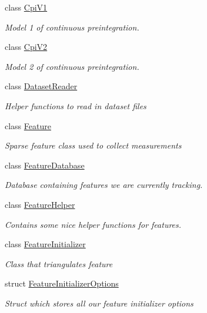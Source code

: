 \begin{DoxyCompactItemize}
class \hyperlink{classov__core_1_1CpiV1}{Cpi\+V1}
\begin{DoxyCompactList}\small\item\em Model 1 of continuous preintegration. \end{DoxyCompactList}\item 
class \hyperlink{classov__core_1_1CpiV2}{Cpi\+V2}
\begin{DoxyCompactList}\small\item\em Model 2 of continuous preintegration. \end{DoxyCompactList}\item 
class \hyperlink{classov__core_1_1DatasetReader}{Dataset\+Reader}
\begin{DoxyCompactList}\small\item\em Helper functions to read in dataset files \end{DoxyCompactList}\item 
class \hyperlink{classov__core_1_1Feature}{Feature}
\begin{DoxyCompactList}\small\item\em Sparse feature class used to collect measurements \end{DoxyCompactList}\item 
class \hyperlink{classov__core_1_1FeatureDatabase}{Feature\+Database}
\begin{DoxyCompactList}\small\item\em Database containing features we are currently tracking. \end{DoxyCompactList}\item 
class \hyperlink{classov__core_1_1FeatureHelper}{Feature\+Helper}
\begin{DoxyCompactList}\small\item\em Contains some nice helper functions for features. \end{DoxyCompactList}\item 
class \hyperlink{classov__core_1_1FeatureInitializer}{Feature\+Initializer}
\begin{DoxyCompactList}\small\item\em Class that triangulates feature \end{DoxyCompactList}\item 
struct \hyperlink{structov__core_1_1FeatureInitializerOptions}{Feature\+Initializer\+Options}
\begin{DoxyCompactList}\small\item\em Struct which stores all our feature initializer options \end{DoxyCompactList}\item 

\end{DoxyCompactItemize}
